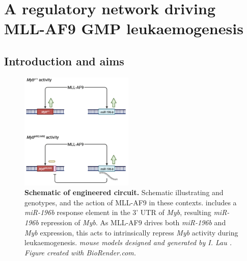 
\chapter{\label{chapter5_normToLeuk}A regulatory network driving MLL-AF9 GMP leukaemogenesis}

\begingroup
\raggedright
\minitoc
\endgroup


\clearpage{}
\section{\label{ch5:mre-intro}Introduction and aims}

\begin{figure}
  \begin{center}
    \includegraphics[width=0.48\textwidth]{figures/chapter5/ch5_mre-intro.png}
  \end{center}
  \caption[{Schematic of \mybmre{} engineered circuit.}]
    {\textbf{Schematic of \mybmre{} engineered circuit.} 
    Schematic illustrating \mybwt{} and \mybmre{} genotypes, and the action of MLL-AF9 in these contexts. \mybmre{} includes a \textit{miR-196b} response element in the 3' UTR of \textit{Myb}, resulting \textit{miR-196b} repression of \textit{Myb}. As MLL-AF9 drives both \textit{miR-196b} and \textit{Myb} expression, this acts to intrinsically repress \textit{Myb} activity during leukaemogenesis. 
    \textit{\mybmre{} mouse models designed and generated by I. Lau \citep{lau_role_2022}. Figure created with BioRender.com.}
    }
    \label{fig:ch5_mre-intro}
\end{figure}

